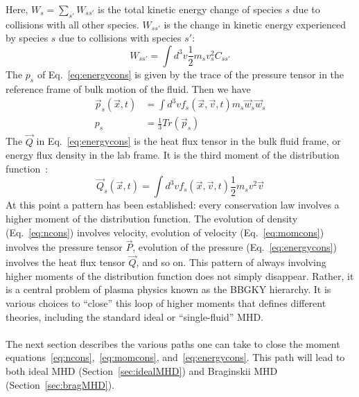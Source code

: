 Here, $W_s=\sum_{s'}W_{ss'}$ is the total kinetic energy change of species $s$ due to collisions with all other species. $W_{ss'}$ is the change in kinetic energy experienced by species $s$ due to collisions with species $s'$:
\begin{equation}
  W_{ss'}=\int d^3v\frac12m_sv_s^2C_{ss'}
\end{equation}
The $p_s$ of Eq.~\ref{eq:energycons} is given by the trace of the pressure tensor in the reference frame of bulk motion of the fluid. Then we have
\begin{align}
  \vec p_s(\vec x,t)&=\int d^3vf_s(\vec x,\vec v,t)m_s\vec w_s\vec w_s\\
  p_s&=\frac13Tr(\vec p_s)
\end{align}
The $\vec Q$ in Eq.~\ref{eq:energycons} is the heat flux tensor in the bulk fluid frame, or energy flux density in the lab frame. It is the third moment of the distribution function~\cite{Hazeltine2004}:
\begin{equation}
  \vec Q_s(\vec x,t)=\int d^3vf_s(\vec x,\vec v,t)\frac12 m_sv^2\vec v
\end{equation}
At this point a pattern has been established: every conservation law involves a higher moment of the distribution function. The evolution of density (Eq.~\ref{eq:ncons}) involves velocity, evolution of velocity (Eq.~\ref{eq:momcons}) involves the pressure tensor $\vec P$, evolution of the pressure (Eq.~\ref{eq:energycons}) involves the heat flux tensor $\vec Q$, and so on. This pattern of always involving higher moments of the distribution function does not simply disappear. Rather, it is a central problem of plasma physics known as the BBGKY hierarchy. It is various choices to ``close'' this loop of higher moments that defines different theories, including the standard ideal or ``single-fluid'' MHD. \\
\\
The next section describes the various paths one can take to close the moment equations~\ref{eq:ncons},~\ref{eq:momcons}, and~\ref{eq:energycons}. This path will lead to both ideal MHD (Section~\ref{sec:idealMHD}) and Braginskii MHD (Section~\ref{sec:bragMHD}).

